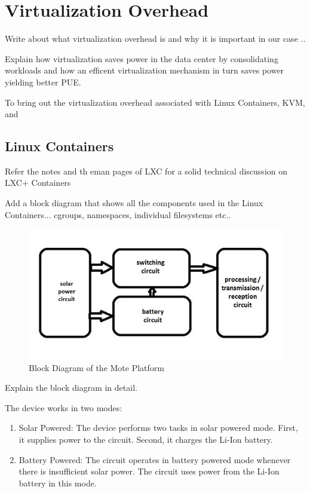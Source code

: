 \chapter{Virtualization Overhead}
Write about what virtualization overhead is and why it is important in our case ..

Explain how virtualization saves power in the data center by consolidating workloads and how an efficent virtualization mechanism in turn saves power yielding better PUE.

To bring out the virtualization overhead associated with Linux Containers, KVM, and 

\section{Linux Containers}
Refer the notes and th eman pages of LXC for a solid technical discussion on LXC+ Containers

Add a block diagram that shows all the components used in the Linux Containers... cgroups, namespaces, individual filesystems etc..

\begin{figure}[htbp]
\centering
\includegraphics[width=\columnwidth]{block_dia.png}
\caption{Block Diagram of the Mote Platform}
\label{img_blockDia}
\end{figure}


Explain the block diagram in detail.

The device works in two modes:
\begin{enumerate}
\item Solar Powered:
The device performs two tasks in solar powered mode. First, it supplies power to the circuit. Second, it charges the Li-Ion battery.
\item Battery Powered:
The circuit operates in battery powered mode whenever there is insufficient solar power. The circuit uses power from the Li-Ion battery in this mode.
\end{enumerate}

